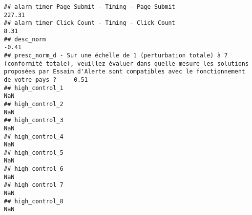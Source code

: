 \documentclass[
]{article}
\begin{document}
\begin{verbatim}
## alarm_timer_Page Submit - Timing - Page Submit                                                                                                                                                                               227.31
## alarm_timer_Click Count - Timing - Click Count                                                                                                                                                                                 8.31
## desc_norm                                                                                                                                                                                                                     -0.41
## presc_norm_d - Sur une échelle de 1 (perturbation totale) à 7 (conformité totale), veuillez évaluer dans quelle mesure les solutions proposées par Essaim d'Alerte sont compatibles avec le fonctionnement de votre pays ?     0.51
## high_control_1                                                                                                                                                                                                                  NaN
## high_control_2                                                                                                                                                                                                                  NaN
## high_control_3                                                                                                                                                                                                                  NaN
## high_control_4                                                                                                                                                                                                                  NaN
## high_control_5                                                                                                                                                                                                                  NaN
## high_control_6                                                                                                                                                                                                                  NaN
## high_control_7                                                                                                                                                                                                                  NaN
## high_control_8                                                                                                                                                                                                                  NaN

\end{verbatim}
\end{document}
